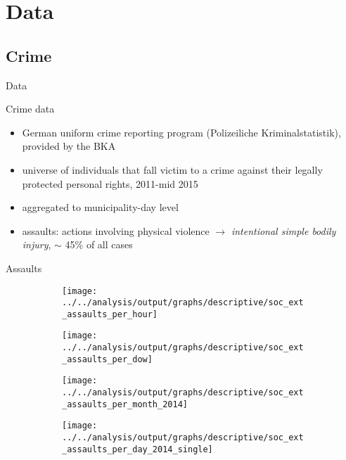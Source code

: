\documentclass[usenames,dvipsnames]{beamer} %
\begin{document}
\section{Data}
	\subsection{Crime}
	\begin{frame}{Data}\label{CRIME_DATA}
		\begin{block}{Crime data}
			\begin{itemize}
				\item German uniform crime reporting program (Polizeiliche Kriminalstatistik), provided by the BKA
				\item universe of individuals that fall victim to a crime against their legally protected personal rights, 2011-mid 2015
				\item aggregated to municipality-day level
				\item assaults: actions involving physical violence $\rightarrow$ \textit{intentional simple bodily injury}, $\sim$ 45\% of all cases
				\newline\hyperlink{CRIMINAL_OFFENSE_CODES}{}
			\end{itemize}
		\end{block}	
	\end{frame}




	\begin{frame}{Assaults}
		\begin{figure}
			\begin{subfigure}[h]{0.48\linewidth}\centering
				\texttt{[image: ../../analysis/output/graphs/descriptive/soc\_ext\_assaults\_per\_hour]}
			\end{subfigure}
			\begin{subfigure}[h]{0.48\linewidth}\centering
				\texttt{[image: ../../analysis/output/graphs/descriptive/soc\_ext\_assaults\_per\_dow]}
			\end{subfigure}
			\begin{subfigure}[h]{0.48\linewidth}\centering
				\texttt{[image: ../../analysis/output/graphs/descriptive/soc\_ext\_assaults\_per\_month\_2014]}
			\end{subfigure}
			\begin{subfigure}[h]{0.48\linewidth}\centering
				\texttt{[image: ../../analysis/output/graphs/descriptive/soc\_ext\_assaults\_per\_day\_2014\_single]}
			\end{subfigure}
		\end{figure}
	\end{frame}
\end{document}
